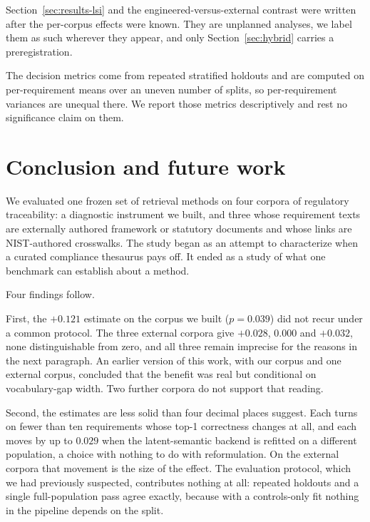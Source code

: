 \documentclass[smallextended,natbib]{svjour3}
\begin{document}
Section~\ref{sec:results-lsi} and the engineered-versus-external contrast were written after the per-corpus effects were known. They are unplanned analyses, we label them as such wherever they appear, and only Section~\ref{sec:hybrid} carries a preregistration.

The decision metrics come from repeated stratified holdouts and are computed on per-requirement means over an uneven number of splits, so per-requirement variances are unequal there. We report those metrics descriptively and rest no significance claim on them.


\section{Conclusion and future work}
\label{sec:conclusion}

We evaluated one frozen set of retrieval methods on four corpora of regulatory traceability: a diagnostic instrument we built, and three whose requirement texts are externally authored framework or statutory documents and whose links are NIST-authored crosswalks.
The study began as an attempt to characterize when a curated compliance thesaurus pays off. It ended as a study of what one benchmark can establish about a method.

Four findings follow.

First, the $+0.121$ estimate on the corpus we built ($p = 0.039$) did not recur under a common protocol. The three external corpora give $+0.028$, $0.000$ and $+0.032$, none distinguishable from zero, and all three remain imprecise for the reasons in the next paragraph. An earlier version of this work, with our corpus and one external corpus, concluded that the benefit was real but conditional on vocabulary-gap width. Two further corpora do not support that reading.

Second, the estimates are less solid than four decimal places suggest. Each turns on fewer than ten requirements whose top-1 correctness changes at all, and each moves by up to $0.029$ when the latent-semantic backend is refitted on a different population, a choice with nothing to do with reformulation. On the external corpora that movement is the size of the effect. The evaluation protocol, which we had previously suspected, contributes nothing at all: repeated holdouts and a single full-population pass agree exactly, because with a controls-only fit nothing in the pipeline depends on the split.
\end{document}
